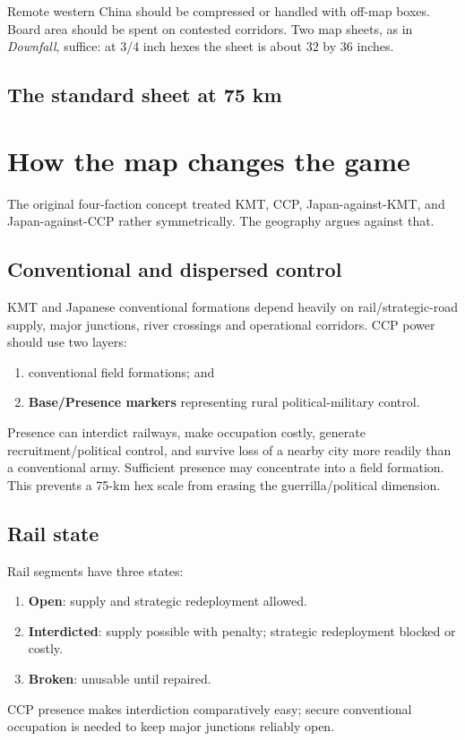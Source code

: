 \documentclass[11pt]{article}
\begin{document}
Remote western China should be compressed or handled with off-map boxes. Board area should be spent on contested corridors. Two map sheets, as in \emph{Downfall}, suffice: at 3/4 inch hexes the sheet is about 32 by 36 inches.

\subsection{The standard sheet at 75 km}\label{sub:sheet75}


\section{How the map changes the game}
The original four-faction concept treated KMT, CCP, Japan-against-KMT, and Japan-against-CCP rather symmetrically. The geography argues against that.

\subsection{Conventional and dispersed control}
KMT and Japanese conventional formations depend heavily on rail/strategic-road supply, major junctions, river crossings and operational corridors. CCP power should use two layers:
\begin{enumerate}
\item conventional field formations; and
\item \textbf{Base/Presence markers} representing rural political-military control.
\end{enumerate}
Presence can interdict railways, make occupation costly, generate recruitment/political control, and survive loss of a nearby city more readily than a conventional army. Sufficient presence may concentrate into a field formation. This prevents a 75-km hex scale from erasing the guerrilla/political dimension.

\subsection{Rail state}
Rail segments have three states:
\begin{enumerate}
\item \textbf{Open}: supply and strategic redeployment allowed.
\item \textbf{Interdicted}: supply possible with penalty; strategic redeployment blocked or costly.
\item \textbf{Broken}: unusable until repaired.
\end{enumerate}
CCP presence makes interdiction comparatively easy; secure conventional occupation is needed to keep major junctions reliably open.
\end{document}
